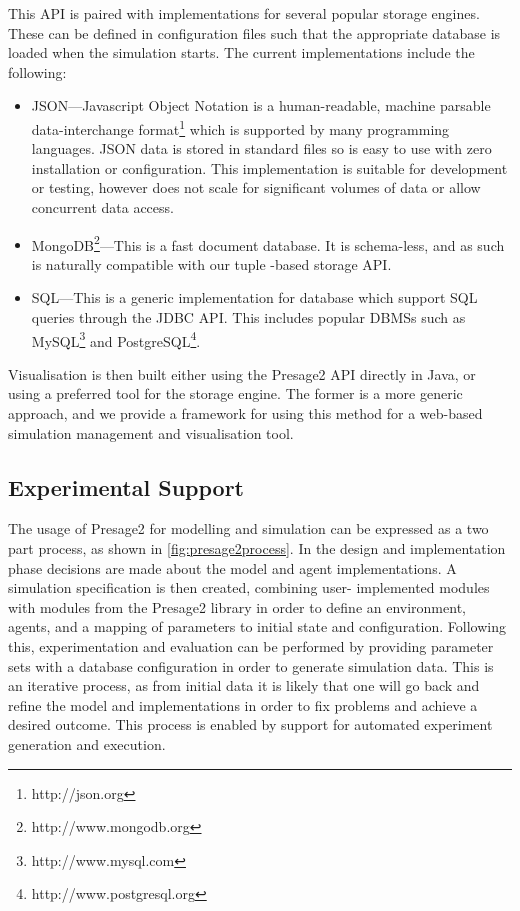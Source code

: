 This \ac{API} is paired with implementations for several popular storage
engines. These can be defined in configuration files such that the appropriate
database is loaded when the simulation starts. The current implementations
include the following:
\begin{itemize}
	\item JSON---Javascript Object Notation is a human-readable, machine parsable
	data-interchange format\footnote{http://json.org} which is supported by many
	programming languages. JSON data is stored in standard files so is easy to use
	with zero installation or configuration. This implementation is suitable for
	development or testing, however does not scale for significant volumes of data
	or allow concurrent data access.
	\item MongoDB\footnote{http://www.mongodb.org}---This is a fast document
	database. It is schema-less, and as such is naturally compatible with our tuple
	-based storage \ac{API}.
	\item SQL---This is a generic implementation for database which support SQL
	queries through the \ac{JDBC} \ac{API}. This includes popular \acp{DBMS} such
	as MySQL\footnote{http://www.mysql.com} and PostgreSQL\footnote{http://www.postgresql.org}.
\end{itemize}

Visualisation is then built either using the Presage2 \ac{API} directly in Java,
or using a preferred tool for the storage engine. The former is a more generic
approach, and we provide a framework for using this method for a web-based
simulation management and visualisation tool. 

\subsection{Experimental Support}

The usage of Presage2 for modelling and simulation can be expressed as a two
part process, as shown in \autoref{fig:presage2process}. In the design and
implementation phase decisions are made about the model and agent
implementations. A simulation specification is then created, combining user-
implemented modules with modules from the Presage2 library in order to define
an environment, agents, and a mapping of parameters to initial state and
configuration. Following this, experimentation and evaluation can be performed
by providing parameter sets with a database configuration in order to generate
simulation data. This is an iterative process, as from initial data it is
likely that one will go back and refine the model and implementations in order
to fix problems and achieve a desired outcome. This process is enabled by
support for automated experiment generation and execution.

